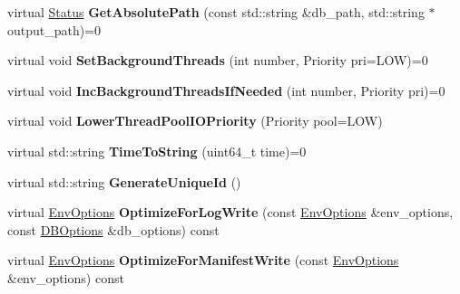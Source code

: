 \begin{DoxyCompactItemize}
\item 
virtual \hyperlink{classrocksdb_1_1Status}{Status} {\bfseries Get\+Absolute\+Path} (const std\+::string \&db\+\_\+path, std\+::string $\ast$output\+\_\+path)=0\hypertarget{classrocksdb_1_1Env_a85e9d22dff053a1ada591614b4ae2994}{}\label{classrocksdb_1_1Env_a85e9d22dff053a1ada591614b4ae2994}

\item 
virtual void {\bfseries Set\+Background\+Threads} (int number, Priority pri=L\+OW)=0\hypertarget{classrocksdb_1_1Env_ae2acfe9f43ea8e5012d6cea69a2cc385}{}\label{classrocksdb_1_1Env_ae2acfe9f43ea8e5012d6cea69a2cc385}

\item 
virtual void {\bfseries Inc\+Background\+Threads\+If\+Needed} (int number, Priority pri)=0\hypertarget{classrocksdb_1_1Env_ae977cc7485297c10951573d8897aaff8}{}\label{classrocksdb_1_1Env_ae977cc7485297c10951573d8897aaff8}

\item 
virtual void {\bfseries Lower\+Thread\+Pool\+I\+O\+Priority} (Priority pool=L\+OW)\hypertarget{classrocksdb_1_1Env_ae8f32ffd20bc281e03f15421b21a4fd7}{}\label{classrocksdb_1_1Env_ae8f32ffd20bc281e03f15421b21a4fd7}

\item 
virtual std\+::string {\bfseries Time\+To\+String} (uint64\+\_\+t time)=0\hypertarget{classrocksdb_1_1Env_ade1259f3f43b344b56b69b5b007d979b}{}\label{classrocksdb_1_1Env_ade1259f3f43b344b56b69b5b007d979b}

\item 
virtual std\+::string {\bfseries Generate\+Unique\+Id} ()\hypertarget{classrocksdb_1_1Env_aa7b5a37eb83cdb2af97e5a7762e8e54e}{}\label{classrocksdb_1_1Env_aa7b5a37eb83cdb2af97e5a7762e8e54e}

\item 
virtual \hyperlink{structrocksdb_1_1EnvOptions}{Env\+Options} {\bfseries Optimize\+For\+Log\+Write} (const \hyperlink{structrocksdb_1_1EnvOptions}{Env\+Options} \&env\+\_\+options, const \hyperlink{structrocksdb_1_1DBOptions}{D\+B\+Options} \&db\+\_\+options) const\hypertarget{classrocksdb_1_1Env_ac9e2bed0406b7d48358a0b6a56fc035c}{}\label{classrocksdb_1_1Env_ac9e2bed0406b7d48358a0b6a56fc035c}

\item 
virtual \hyperlink{structrocksdb_1_1EnvOptions}{Env\+Options} {\bfseries Optimize\+For\+Manifest\+Write} (const \hyperlink{structrocksdb_1_1EnvOptions}{Env\+Options} \&env\+\_\+options) const\hypertarget{classrocksdb_1_1Env_a1f553facfeae570c6b593a8b1bf26fa0}{}\label{classrocksdb_1_1Env_a1f553facfeae570c6b593a8b1bf26fa0}


\end{DoxyCompactItemize}
